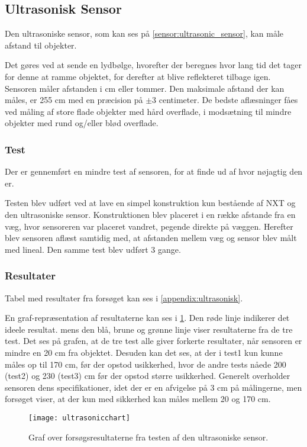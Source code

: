 \subsection{Ultrasonisk Sensor}
Den ultrasoniske sensor, som kan ses på \cref{sensor:ultrasonic_sensor}, kan måle afstand til objekter.

Det gøres ved at sende en lydbølge, hvorefter der beregnes hvor lang tid det tager for denne at ramme objektet, for derefter at blive reflekteret tilbage igen.
Sensoren måler afstanden i cm eller tommer.
Den maksimale afstand der kan måles, er 255 cm med en præcision på $\pm$3 centimeter.
De bedste aflæsninger fåes ved måling af store flade objekter med hård overflade, i modsætning til mindre objekter med rund og/eller blød overflade.\cite{nxt}

\subsubsection{Test}
Der er gennemført en mindre test af sensoren, for at finde ud af hvor nøjagtig den er.

Testen blev udført ved at lave en simpel konstruktion kun bestående af NXT og den ultrasoniske sensor.
Konstruktionen blev placeret i en række afstande fra en væg, hvor sensoreren var placeret vandret, pegende direkte på væggen.
Herefter blev sensoren aflæst samtidig med, at afstanden mellem væg og sensor blev målt med lineal.
Den samme test blev udført 3 gange.

\subsubsection{Resultater} Tabel med resultater fra forsøget kan ses i \cref{appendix:ultrasonisk}.

En graf-repræsentation af resultaterne kan ses i \cref{sensor:ultrasonic_resultat_diagram}.
Den røde linje indikerer det ideele resultat. mens den blå, brune og grønne linje viser resultaterne fra de tre test.
Det ses på grafen, at de tre test alle giver forkerte resultater, når sensoren er mindre en 20 cm fra objektet.
Desuden kan det ses, at der i test1 kun kunne måles op til 170 cm, før der opstod usikkerhed, hvor de andre tests nåede 200 (test2) og 230 (test3) cm før der opstod større usikkerhed.
Generelt overholder sensoren dens specifikationer, idet der er en afvigelse på 3 cm på målingerne, men forsøget viser, at der kun med sikkerhed kan måles mellem 20 og 170 cm.

\begin{figure}[h]
\centering
\texttt{[image: ultrasonicchart]}
\caption{Graf over forsøgsresultaterne fra testen af den ultrasoniske sensor.}
\label{sensor:ultrasonic_resultat_diagram}
\end{figure}




